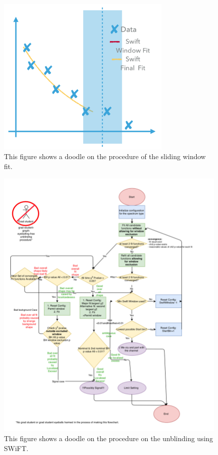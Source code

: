 \begin{figure}[!htb]
    \begin{center}
        \includegraphics[width=0.75\textwidth]{figures/chapter_analysismethod/swift2}
        \caption{
            This figure shows a doodle on the procedure of the sliding window fit. 
        }
        \label{fig:swift}
    \end{center}
\end{figure}

\begin{figure}[!htb] \begin{center}
        \includegraphics[width=1.05\textwidth]{figures/chapter_analysismethod/swift_unblindingflowchart}
        \caption{
            This figure shows a doodle on the procedure on the unblinding using SWiFT.
        }
        \label{fig:unblinding}
    \end{center}
\end{figure}
\FloatBarrier
    
